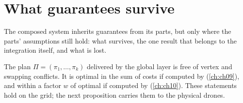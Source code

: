 \section{What guarantees survive}
\label{sec:ch24-guarantees}

The composed system inherits guarantees from its parts, but only where the
parts' assumptions still hold: what survives, the one result that belongs to
the integration itself, and what is lost.

\begin{proposition}
\label{thm:ch24-nominal}
The plan $\Pi = (\pi_1, \dots, \pi_k)$ delivered by the global layer is free
of vertex and swapping conflicts. It is optimal in the sum of costs if
computed by \cbs \cite{sharon2015cbs} (\cref{ch:ch09}), and within a factor
$w$ of optimal if computed by \ecbs \cite{barer2014ecbs} (\cref{ch:ch10}).
These statements hold on the grid; the next proposition carries them to the
physical drones.
\end{proposition}

